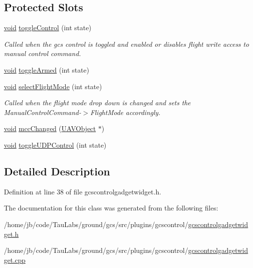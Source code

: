 \subsection*{\-Protected \-Slots}
\begin{DoxyCompactItemize}
\item 
\hyperlink{group___u_a_v_objects_plugin_ga444cf2ff3f0ecbe028adce838d373f5c}{void} \hyperlink{group___g_c_s_control_gadget_plugin_gafe60b9408fffe8389ea6b994b3d5c84e}{toggle\-Control} (int state)
\begin{DoxyCompactList}\small\item\em \-Called when the gcs control is toggled and enabled or disables flight write access to manual control command. \end{DoxyCompactList}\item 
\hyperlink{group___u_a_v_objects_plugin_ga444cf2ff3f0ecbe028adce838d373f5c}{void} \hyperlink{group___g_c_s_control_gadget_plugin_ga77dc1ed2344ac4440aa6348ee32d3104}{toggle\-Armed} (int state)
\item 
\hyperlink{group___u_a_v_objects_plugin_ga444cf2ff3f0ecbe028adce838d373f5c}{void} \hyperlink{group___g_c_s_control_gadget_plugin_gab1ae0cb7fd085ad31a9a7b5d6923f8d4}{select\-Flight\-Mode} (int state)
\begin{DoxyCompactList}\small\item\em \-Called when the flight mode drop down is changed and sets the \-Manual\-Control\-Command-\/$>$\-Flight\-Mode accordingly. \end{DoxyCompactList}\item 
\hyperlink{group___u_a_v_objects_plugin_ga444cf2ff3f0ecbe028adce838d373f5c}{void} \hyperlink{group___g_c_s_control_gadget_plugin_gabdcd9baf431d953b9e2c5f8f2c3d485c}{mcc\-Changed} (\hyperlink{class_u_a_v_object}{\-U\-A\-V\-Object} $\ast$)
\item 
\hyperlink{group___u_a_v_objects_plugin_ga444cf2ff3f0ecbe028adce838d373f5c}{void} \hyperlink{group___g_c_s_control_gadget_plugin_gaaaa6db9417f6f94567e477ed6b5bd099}{toggle\-U\-D\-P\-Control} (int state)
\end{DoxyCompactItemize}


\subsection{\-Detailed \-Description}


\-Definition at line 38 of file gcscontrolgadgetwidget.\-h.



\-The documentation for this class was generated from the following files\-:\begin{DoxyCompactItemize}
\item 
/home/jb/code/\-Tau\-Labs/ground/gcs/src/plugins/gcscontrol/\hyperlink{gcscontrolgadgetwidget_8h}{gcscontrolgadgetwidget.\-h}\item 
/home/jb/code/\-Tau\-Labs/ground/gcs/src/plugins/gcscontrol/\hyperlink{gcscontrolgadgetwidget_8cpp}{gcscontrolgadgetwidget.\-cpp}\end{DoxyCompactItemize}
